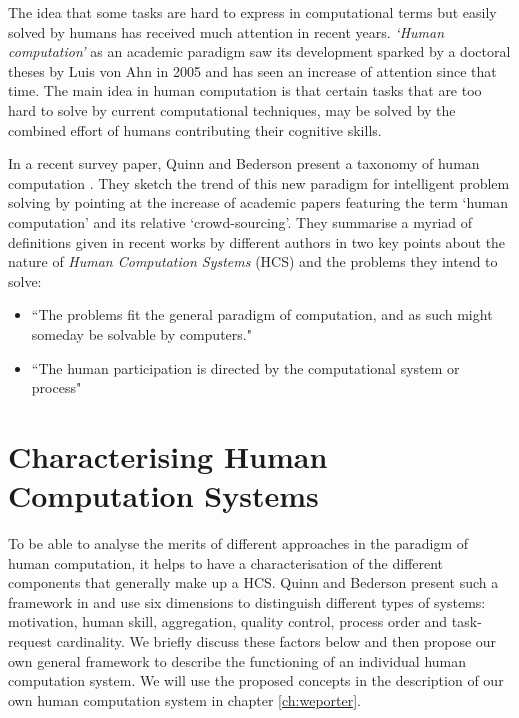 The idea that some tasks are hard to express in computational terms but easily solved by humans has received much attention in recent years. \emph{`Human computation'} as an academic paradigm saw its development sparked by a doctoral theses by Luis von Ahn in 2005 and has seen an increase of attention since that time\cite{Quinn:2011us}. The main idea in human computation is that certain tasks that are too hard to solve by current computational techniques, may be solved by the combined effort of humans contributing their cognitive skills. 

In a recent survey paper, Quinn and Bederson present a taxonomy of human computation \cite{Quinn:2011us}. They sketch the trend of this new paradigm for intelligent problem solving by pointing at the increase of academic papers featuring the term `human computation' and its relative `crowd-sourcing'. They summarise a myriad of definitions given in recent works by different authors in two key points about the nature of \emph{Human Computation Systems} (HCS) and the problems they intend to solve:

\begin{itemize}
  \item ``The problems fit the general paradigm of computation, and as such might someday be solvable by computers."
  \item ``The human participation is directed by the computational system or process"
\end{itemize}




\section{Characterising Human Computation Systems} %
\label{sec:characterising_hcs}

To be able to analyse the merits of different approaches in the paradigm of human computation, it helps to have a characterisation of the different components that generally make up a HCS. Quinn and Bederson present such a framework in \cite{Quinn:2011us} and use six dimensions to distinguish different types of systems: motivation, human skill, aggregation, quality control, process order and task-request cardinality. We briefly discuss these factors below and then propose our own general framework to describe the functioning of an individual human computation system. We will use the proposed concepts in the description of our own human computation system in chapter \ref{ch:weporter}.

